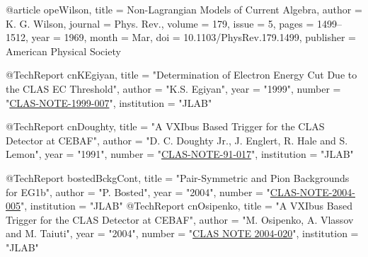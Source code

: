 @article{ opeWilson,
  title = {Non-Lagrangian Models of Current Algebra},
  author = {K. G. Wilson},
  journal = {Phys. Rev.},
  volume = {179},
  issue = {5},
  pages = {1499--1512},
  year = {1969},
  month = {Mar},
  doi = {10.1103/PhysRev.179.1499},
  publisher = {American Physical Society}
}


@TechReport{ cnKEgiyan,
	title = "Determination of Electron Energy Cut Due to the CLAS EC Threshold",
	author = "K.S. Egiyan",
	year = "1999",
	number = "\href{http://wwwold.jlab.org/Hall-B/notes/clas\_notes91/note91-017.pdf}{CLAS-NOTE-1999-007}",
	institution = "JLAB"
}

@TechReport{ cnDoughty,
	title = "A VXIbus Based Trigger for the CLAS Detector at CEBAF",
	author = "{D. C. Doughty Jr., J. Englert, R. Hale and S. Lemon}",
	year = "1991",
	number = "\href{http://wwwold.jlab.org/Hall-B/notes/clas\_notes91/note91-017.pdf}{CLAS-NOTE-91-017}",
	institution = "JLAB"
}

@TechReport{ bostedBckgCont,
	title = "Pair-Symmetric and Pion Backgrounds for EG1b",
	author = "{P. Bosted}",
	year = "2004",
	number = "\href{http://www.jlab.org/Hall-B/notes/clas\_notes04/2004-005.ps}{CLAS-NOTE-2004-005}",
	institution = "JLAB"
}
@TechReport{ cnOsipenko,
	title = "A VXIbus Based Trigger for the CLAS Detector at CEBAF",
	author = "{M. Osipenko, A. Vlassov and M. Taiuti}",
	year = "2004",
	number = "\href{http://www.jlab.org/Hall-B/notes/clas_notes04/2004-020.pdf}{CLAS NOTE 2004-020}",
	institution = "JLAB"
}



